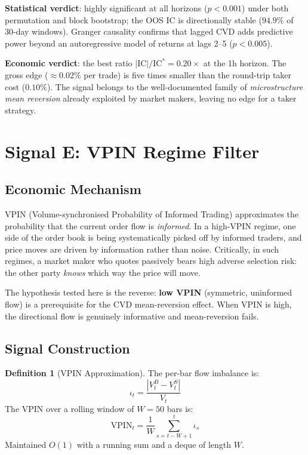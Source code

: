 \documentclass[12pt, a4paper]{article}
\theoremstyle{definition}
\newtheorem{definition}{Definition}[section]
\newcommand{\IC}{\mathrm{IC}}
\begin{document}
\textbf{Statistical verdict}: highly significant at all horizons ($p < 0.001$)
under both permutation and block bootstrap; the OOS IC is directionally stable
($94.9\%$ of 30-day windows). Granger causality confirms that lagged CVD adds
predictive power beyond an autoregressive model of returns at lags 2--5
($p < 0.005$).

\textbf{Economic verdict}: the best ratio $|\IC|/\IC^* = 0.20\times$ at the
1h horizon. The gross edge ($\approx 0.02\%$ per trade) is five times smaller
than the round-trip taker cost ($0.10\%$). The signal belongs to the
well-documented family of \emph{microstructure mean reversion} already
exploited by market makers, leaving no edge for a taker strategy.


\section{Signal E: VPIN Regime Filter}

\subsection{Economic Mechanism}

VPIN (Volume-synchronised Probability of Informed Trading) approximates
the probability that the current order flow is \emph{informed}. In a
high-VPIN regime, one side of the order book is being systematically
picked off by informed traders, and price moves are driven by information
rather than noise. Critically, in such regimes, a market maker who quotes
passively bears high adverse selection risk: the other party \emph{knows}
which way the price will move.

The hypothesis tested here is the reverse: \textbf{low VPIN} (symmetric,
uninformed flow) is a prerequisite for the CVD mean-reversion effect. When
VPIN is high, the directional flow is genuinely informative and
mean-reversion fails.

\subsection{Signal Construction}

\begin{definition}[VPIN Approximation]
  The per-bar flow imbalance is:
  \[
    \iota_t = \frac{|V_t^B - V_t^S|}{V_t}
  \]
  The VPIN over a rolling window of $W = 50$ bars is:
  \[
    \text{VPIN}_t = \frac{1}{W}\sum_{s=t-W+1}^{t} \iota_s
  \]
  Maintained $O(1)$ with a running sum and a deque of length $W$.
\end{definition}
\end{document}
